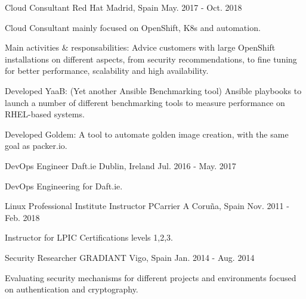 \begin{cventries}
  \cventry
    {Cloud Consultant} %
    {Red Hat} %
    {Madrid, Spain} %
    {May. 2017 - Oct. 2018} %
    {
      \begin{cvitems} %
        \item {Cloud Consultant mainly focused on OpenShift, K8s and automation.}
        \item {Main activities \& responsabilities: Advice customers with large OpenShift installations on different aspects, from security recommendations, to fine tuning for better performance, scalability and high availability.}
        \item {Developed YaaB: (Yet another Ansible Benchmarking tool) Ansible playbooks to launch a number of different benchmarking tools to measure performance on RHEL-based systems.}
        \item {Developed Goldem: A tool to automate golden image creation, with the same goal as packer.io. }
      \end{cvitems}
    }
  \cventry
    {DevOps Engineer} %
    {Daft.ie} %
    {Dublin, Ireland} %
    {Jul. 2016 - May. 2017} %
    {
      \begin{cvitems} %
        \item {DevOps Engineering for Daft.ie.}
      \end{cvitems}
    }
  \cventry
    {Linux Professional Institute Instructor} %
    {PCarrier} %
    {A Coruña, Spain} %
    {Nov. 2011 - Feb. 2018} %
    {
      \begin{cvitems} %
        \item {Instructor for LPIC Certifications levels 1,2,3.}
      \end{cvitems}
    }
  \cventry
    {Security Researcher} %
    {GRADIANT} %
    {Vigo, Spain} %
    {Jan. 2014 - Aug. 2014} %
    {
      \begin{cvitems} %
        \item {Evaluating security mechanisms for different projects and environments focused on authentication and cryptography.}

\end{cvitems}}
\end{cventries}
